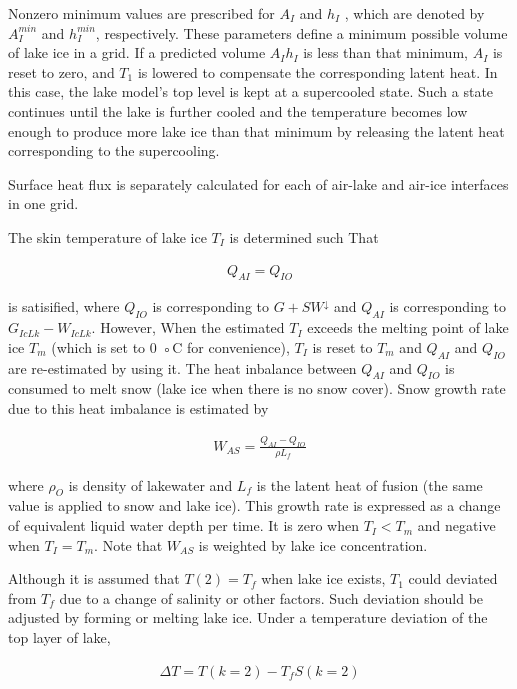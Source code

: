 Nonzero minimum values are prescribed for \(A_I\) and \(h_I\) , which
are denoted by \(A^{min}_I\) and \(h^{min}_I\), respectively. These
parameters define a minimum possible volume of lake ice in a grid. If a
predicted volume \(A_Ih_I\) is less than that minimum, \(A_I\) is reset
to zero, and \(T_1\) is lowered to compensate the corresponding latent
heat. In this case, the lake model's top level is kept at a supercooled
state. Such a state continues until the lake is further cooled and the
temperature becomes low enough to produce more lake ice than that
minimum by releasing the latent heat corresponding to the supercooling.

Surface heat flux is separately calculated for each of air-lake and
air-ice interfaces in one grid.

The skin temperature of lake ice \(T_I\) is determined such That

\begin{eqnarray}
    Q_{AI} = Q_{IO}
\end{eqnarray}

is satisified, where \(Q_{IO}\) is corresponding to \(G+SW^\downarrow\)
and \(Q_{AI}\) is corresponding to \(G_{IcLk} - W_{IcLk}\). However,
When the estimated \(T_I\) exceeds the melting point of lake ice \(T_m\)
(which is set to 0 ◦C for convenience), \(T_I\) is reset to \(T_m\) and
\(Q_{AI}\) and \(Q_{IO}\) are re-estimated by using it. The heat
inbalance between \(Q_{AI}\) and \(Q_{IO}\) is consumed to melt snow
(lake ice when there is no snow cover). Snow growth rate due to this
heat imbalance is estimated by

\begin{eqnarray}
    W_{AS} = \frac{Q_{AI}-Q_{IO}}{\rho L_f}
\end{eqnarray}

where \(\rho_O\) is density of lakewater and \(L_f\) is the latent heat
of fusion (the same value is applied to snow and lake ice). This growth
rate is expressed as a change of equivalent liquid water depth per time.
It is zero when \(T_I < T_m\) and negative when \(T_I = T_m\). Note that
\(W_{AS}\) is weighted by lake ice concentration.

Although it is assumed that \(T(2) = T_f\) when lake ice exists, \(T_1\)
could deviated from \(T_f\) due to a change of salinity or other
factors. Such deviation should be adjusted by forming or melting lake
ice. Under a temperature deviation of the top layer of lake,

\begin{eqnarray}
    \Delta T = T(k=2) - T_f S(k=2)
\end{eqnarray}

